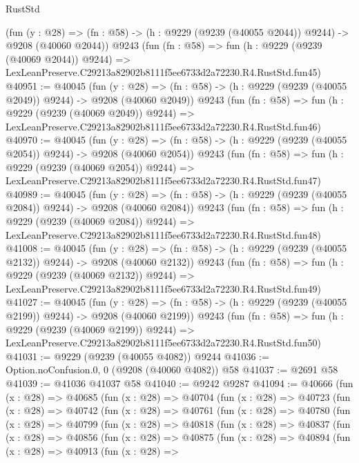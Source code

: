 \begin{lexlean}{RustStd}
\begin{coremodule}
    (fun (y : @28) =>
    (fn : @58) -> (h : @9229 (@9239 (@40055 @2044)) @9244) -> @9208 (@40060 @2044))
    @9243
    (fun (fn : @58) =>
    fun (h : @9229 (@9239 (@40069 @2044)) @9244) =>
    LexLeanPreserve.C29213a82902b8111f5ee6733d2a72230.R4.RustStd.fun45)
@40951 := @40045
    (fun (y : @28) =>
    (fn : @58) -> (h : @9229 (@9239 (@40055 @2049)) @9244) -> @9208 (@40060 @2049))
    @9243
    (fun (fn : @58) =>
    fun (h : @9229 (@9239 (@40069 @2049)) @9244) =>
    LexLeanPreserve.C29213a82902b8111f5ee6733d2a72230.R4.RustStd.fun46)
@40970 := @40045
    (fun (y : @28) =>
    (fn : @58) -> (h : @9229 (@9239 (@40055 @2054)) @9244) -> @9208 (@40060 @2054))
    @9243
    (fun (fn : @58) =>
    fun (h : @9229 (@9239 (@40069 @2054)) @9244) =>
    LexLeanPreserve.C29213a82902b8111f5ee6733d2a72230.R4.RustStd.fun47)
@40989 := @40045
    (fun (y : @28) =>
    (fn : @58) -> (h : @9229 (@9239 (@40055 @2084)) @9244) -> @9208 (@40060 @2084))
    @9243
    (fun (fn : @58) =>
    fun (h : @9229 (@9239 (@40069 @2084)) @9244) =>
    LexLeanPreserve.C29213a82902b8111f5ee6733d2a72230.R4.RustStd.fun48)
@41008 := @40045
    (fun (y : @28) =>
    (fn : @58) -> (h : @9229 (@9239 (@40055 @2132)) @9244) -> @9208 (@40060 @2132))
    @9243
    (fun (fn : @58) =>
    fun (h : @9229 (@9239 (@40069 @2132)) @9244) =>
    LexLeanPreserve.C29213a82902b8111f5ee6733d2a72230.R4.RustStd.fun49)
@41027 := @40045
    (fun (y : @28) =>
    (fn : @58) -> (h : @9229 (@9239 (@40055 @2199)) @9244) -> @9208 (@40060 @2199))
    @9243
    (fun (fn : @58) =>
    fun (h : @9229 (@9239 (@40069 @2199)) @9244) =>
    LexLeanPreserve.C29213a82902b8111f5ee6733d2a72230.R4.RustStd.fun50)
@41031 := @9229 (@9239 (@40055 @4082)) @9244
@41036 := Option.noConfusion.{0, 0} (@9208 (@40060 @4082)) @58
@41037 := @2691 @58
@41039 := @41036 @41037 @58
@41040 := @9242 @9287
@41094 := @40666
    (fun (x : @28) =>
    @40685
      (fun (x : @28) =>
      @40704
        (fun (x : @28) =>
        @40723
          (fun (x : @28) =>
          @40742
            (fun (x : @28) =>
            @40761
              (fun (x : @28) =>
              @40780
                (fun (x : @28) =>
                @40799
                  (fun (x : @28) =>
                  @40818
                    (fun (x : @28) =>
                    @40837
                      (fun (x : @28) =>
                      @40856
                        (fun (x : @28) =>
                        @40875
                          (fun (x : @28) =>
                          @40894
                            (fun (x : @28) =>
                            @40913
                              (fun (x : @28) =>

\end{coremodule}
\end{lexlean}
